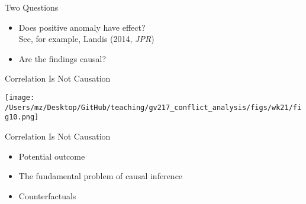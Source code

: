 \documentclass[handout]{beamer}
\begin{document}
\begin{frame}{Two Questions}
    \begin{itemize}
        \pause\item Does positive anomaly have effect?\\
        \pause      See, for example, Landis (2014, \emph{JPR})
        \pause\item Are the findings causal?
    \end{itemize}
\end{frame}

\begin{frame}{Correlation Is Not Causation}
    \pause
    \begin{center}
        \texttt{[image: /Users/mz/Desktop/GitHub/teaching/gv217\_conflict\_analysis/figs/wk21/fig10.png]}
    \end{center}
\end{frame}

\begin{frame}{Correlation Is Not Causation}
    \begin{itemize}
        \pause\item Potential outcome
        \pause\item The fundamental problem of causal inference
        \pause\item Counterfactuals
    \end{itemize}
\end{frame}
\end{document}
